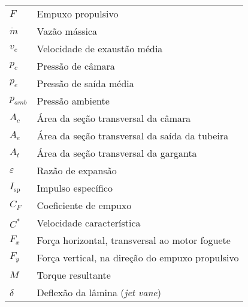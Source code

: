 \begin{longtable}{ll}
\(F\) & Empuxo propulsivo \\
\(\dot{m}\) & Vazão mássica \\
\(v_e\) & Velocidade de exaustão média \\
\(p_c\) & Pressão de câmara \\
\(p_e\) & Pressão de saída média \\
\(p_{amb}\) & Pressão ambiente \\
\(A_c\) & Área da seção transversal da câmara \\
\(A_e\) & Área da seção transversal da saída da tubeira \\
\(A_t\) & Área da seção transversal da garganta \\
\(\varepsilon\) & Razão de expansão \\
\(I_{\mathrm{sp}}\) & Impulso específico \\
\(C_F\) & Coeficiente de empuxo \\
\(C^*\) & Velocidade característica \\
\(F_x\) & Força horizontal, transversal ao motor foguete \\
\(F_y\) & Força vertical, na direção do empuxo propulsivo \\
\(M\) & Torque resultante \\
\(\delta \) & Deflexão da lâmina (\textit{jet vane})
\end{longtable}

